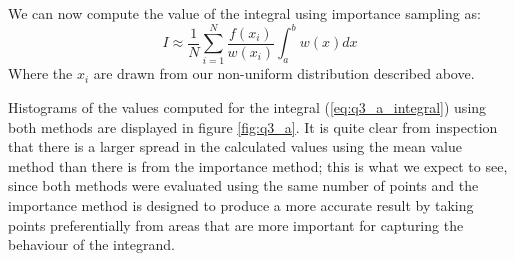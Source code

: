 \documentclass{article}
\begin{document}
We can now compute the value of the integral using importance sampling as:
\begin{equation}
	\label{eq:q3_is}
	I \approx \frac{1}{N}\sum_{i=1}^N \frac{f(x_i)}{w(x_i)} \int_a^b w(x)dx
\end{equation}
Where the $x_i$ are drawn from our non-uniform distribution described above.

Histograms of the values computed for the integral (\ref{eq:q3_a_integral}) using both methods are displayed in figure \ref{fig:q3_a}. It is quite clear from inspection that there is a larger spread in the calculated values using the mean value method than there is from the importance method; this is what we expect to see, since both methods were evaluated using the same number of points and the importance method is designed to produce a more accurate result by taking points preferentially from areas that are more important for capturing the behaviour of the integrand.
\end{document}
